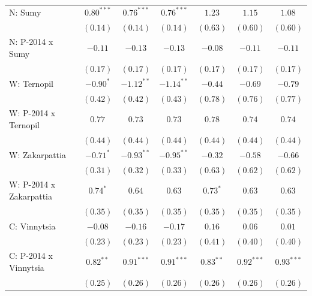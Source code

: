 \begin{table}
\begin{center}
\begin{small}
\begin{tabular}{l c c c c c c}
N: Sumy                     & $0.80^{***}$  & $0.76^{***}$  & $0.76^{***}$  & $1.23$       & $1.15$       & $1.08$       \\
                            & $(0.14)$      & $(0.14)$      & $(0.14)$      & $(0.63)$     & $(0.60)$     & $(0.60)$     \\
N: P-2014 x Sumy            & $-0.11$       & $-0.13$       & $-0.13$       & $-0.08$      & $-0.11$      & $-0.11$      \\
                            & $(0.17)$      & $(0.17)$      & $(0.17)$      & $(0.17)$     & $(0.17)$     & $(0.17)$     \\
W: Ternopil                 & $-0.90^{*}$   & $-1.12^{**}$  & $-1.14^{**}$  & $-0.44$      & $-0.69$      & $-0.79$      \\
                            & $(0.42)$      & $(0.42)$      & $(0.43)$      & $(0.78)$     & $(0.76)$     & $(0.77)$     \\
W: P-2014 x Ternopil        & $0.77$        & $0.73$        & $0.73$        & $0.78$       & $0.74$       & $0.74$       \\
                            & $(0.44)$      & $(0.44)$      & $(0.44)$      & $(0.44)$     & $(0.44)$     & $(0.44)$     \\
W: Zakarpattia              & $-0.71^{*}$   & $-0.93^{**}$  & $-0.95^{**}$  & $-0.32$      & $-0.58$      & $-0.66$      \\
                            & $(0.31)$      & $(0.32)$      & $(0.33)$      & $(0.63)$     & $(0.62)$     & $(0.62)$     \\
W: P-2014 x Zakarpattia     & $0.74^{*}$    & $0.64$        & $0.63$        & $0.73^{*}$   & $0.63$       & $0.63$       \\
                            & $(0.35)$      & $(0.35)$      & $(0.35)$      & $(0.35)$     & $(0.35)$     & $(0.35)$     \\
C: Vinnytsia                & $-0.08$       & $-0.16$       & $-0.17$       & $0.16$       & $0.06$       & $0.01$       \\
                            & $(0.23)$      & $(0.23)$      & $(0.23)$      & $(0.41)$     & $(0.40)$     & $(0.40)$     \\
C: P-2014 x Vinnytsia       & $0.82^{**}$   & $0.91^{***}$  & $0.91^{***}$  & $0.83^{**}$  & $0.92^{***}$ & $0.93^{***}$ \\
                            & $(0.25)$      & $(0.26)$      & $(0.26)$      & $(0.26)$     & $(0.26)$     & $(0.26)$     \\

\end{tabular}
\end{small}
\end{center}
\end{table}
